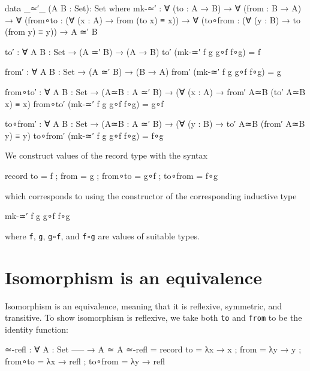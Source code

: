 \begin{fence}
\begin{code}
data _≃′_ (A B : Set): Set where
  mk-≃′ : ∀ (to : A → B) →
          ∀ (from : B → A) →
          ∀ (from∘to : (∀ (x : A) → from (to x) ≡ x)) →
          ∀ (to∘from : (∀ (y : B) → to (from y) ≡ y)) →
          A ≃′ B

to′ : ∀ {A B : Set} → (A ≃′ B) → (A → B)
to′ (mk-≃′ f g g∘f f∘g) = f

from′ : ∀ {A B : Set} → (A ≃′ B) → (B → A)
from′ (mk-≃′ f g g∘f f∘g) = g

from∘to′ : ∀ {A B : Set} → (A≃B : A ≃′ B) → (∀ (x : A) → from′ A≃B (to′ A≃B x) ≡ x)
from∘to′ (mk-≃′ f g g∘f f∘g) = g∘f

to∘from′ : ∀ {A B : Set} → (A≃B : A ≃′ B) → (∀ (y : B) → to′ A≃B (from′ A≃B y) ≡ y)
to∘from′ (mk-≃′ f g g∘f f∘g) = f∘g
\end{code}
\end{fence}

We construct values of the record type with the syntax

\begin{myDisplay}
record
  { to    = f
  ; from  = g
  ; from∘to = g∘f
  ; to∘from = f∘g
  }
\end{myDisplay}

which corresponds to using the constructor of the corresponding
inductive type

\begin{myDisplay}
mk-≃′ f g g∘f f∘g
\end{myDisplay}

where \texttt{f}, \texttt{g}, \texttt{g∘f}, and \texttt{f∘g} are values
of suitable types.

\hypertarget{isomorphism-is-an-equivalence}{%
\section{Isomorphism is an
equivalence}\label{isomorphism-is-an-equivalence}}

Isomorphism is an equivalence, meaning that it is reflexive, symmetric,
and transitive. To show isomorphism is reflexive, we take both
\texttt{to} and \texttt{from} to be the identity function:

\begin{fence}
\begin{code}
≃-refl : ∀ {A : Set}
    -----
  → A ≃ A
≃-refl =
  record
    { to      = λ{x → x}
    ; from    = λ{y → y}
    ; from∘to = λ{x → refl}
    ; to∘from = λ{y → refl}
    }
\end{code}
\end{fence}

